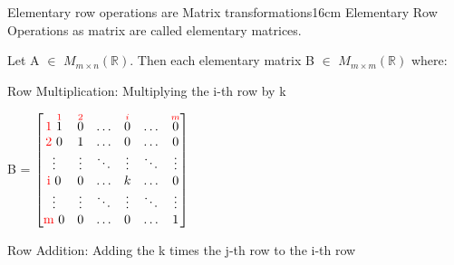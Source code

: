     \newpage



    \begin{definition}{Elementary row operations are Matrix transformations}{16cm}
        Elementary Row Operations as matrix
        are called {\color{lblue} elementary matrices}.

        Let A $\in$ $M_{m \times n}(\mathbb{R})$.
        Then each elementary matrix B $\in$ $M_{m \times m}(\mathbb{R})$ where:
 
        \hspace{0.5cm}
        {\color{lgreen} Row Multiplication}:
        Multiplying the i-th row by k

        \hspace{1cm}
        B =
        $\begin{bmatrix}
            \text{\color{red} 1 } \overset{{\color{red} 1}}{1}
                & \overset{{\color{red} 2}}{0} & \hdots
                & \overset{{\color{red} i}}{0} & \hdots
                & \overset{{\color{red} m}}{0} \\
            \text{\color{red} 2 } 0 & 1 & \hdots & 0 & \hdots & 0 \\
            \vdots & \vdots & \ddots & \vdots & \ddots & \vdots \\
            \text{\color{red} i } 0 & 0 & \hdots & k & \hdots & 0 \\
            \vdots & \vdots & \ddots & \vdots & \ddots & \vdots \\
            \text{\color{red} m } 0 & 0 & \hdots & 0 & \hdots & 1
        \end{bmatrix}$

        \hspace{0.5cm}
        {\color{lgreen} Row Addition}:
        Adding the k times the j-th row to the i-th row


\end{definition}
